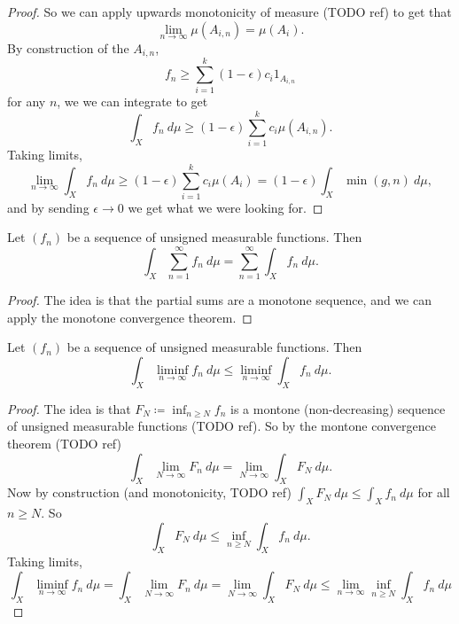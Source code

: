 \documentclass[12pt]{article}
\begin{document}
\begin{proof}
	So we can apply upwards monotonicity of measure (TODO ref) to get that 
	\begin{equation*}
		\lim_{n\to\infty}\mu(A_{i,n})=\mu(A_i).
	\end{equation*}
	By construction of the $A_{i,n}$,
	\begin{equation*}
		f_n\geq\sum_{i=1}^k(1-\epsilon)c_i1_{A_{i,n}}
	\end{equation*}
	for any $n$, we we can integrate to get
	\begin{equation*}
		\int_X f_n\ d\mu\geq (1-\epsilon)\sum_{i=1}^k c_i\mu(A_{i,n}).
	\end{equation*}
	Taking limits,
	\begin{equation*}
		\lim_{n\to\infty}\int_X f_n\ d\mu\geq (1-\epsilon)\sum_{i=1}^kc_i\mu(A_i)=(1-\epsilon)\int_X\min(g,n)\ d\mu,
	\end{equation*}
	and by sending $\epsilon\to 0$ we get what we were looking for.
\end{proof}

\begin{corollary}
	Let $(f_n)$ be a sequence of unsigned measurable functions. Then 
	\begin{equation*}
		\int_X\sum_{n=1}^\infty f_n\ d\mu=\sum_{n=1}^\infty\int_X f_n\ d\mu.
	\end{equation*}
\end{corollary}

\begin{proof}
	The idea is that the partial sums are a monotone sequence, and we can apply the monotone convergence theorem.
\end{proof}

\begin{corollary}
	Let $(f_n)$ be a sequence of unsigned measurable functions. Then 
	\begin{equation*}
		\int_X\liminf_{n\to\infty}f_n\ d\mu\leq\liminf_{n\to\infty}\int_X f_n\ d\mu.
	\end{equation*}
\end{corollary}

\begin{proof}
	The idea is that $F_N\coloneqq\inf_{n\geq N}f_n$ is a montone (non-decreasing) sequence of unsigned measurable functions (TODO ref). So by the montone convergence theorem (TODO ref)
	\begin{equation*}
		\int_X\lim_{N\to\infty}F_n\ d\mu = \lim_{N\to\infty}\int_X F_N\ d\mu.
	\end{equation*}
	Now by construction (and monotonicity, TODO ref) $\int_X F_N\ d\mu\leq\int_X f_n\ d\mu$ for all $n\geq N$. So 
	\begin{equation*}
		\int_X F_N\ d\mu\leq\inf_{n\geq N}\int_X f_n\ d\mu.
	\end{equation*}
	Taking limits, 
	\begin{equation*}
		\int_X \liminf_{n\to\infty}f_n\ d\mu=\int_X \lim_{N\to\infty}F_n\ d\mu=\lim_{N\to\infty}\int_X F_N\ d\mu\leq\lim_{n\to\infty}\inf_{n\geq N}\int_X f_n\ d\mu
	\end{equation*}
\end{proof}
\end{document}
